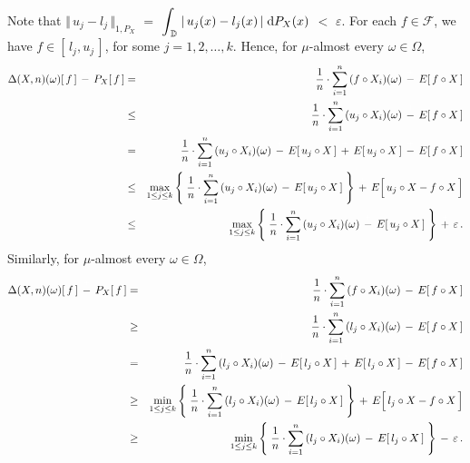 Note that
$\Vert\,u_{j} - l_{j}\,\Vert_{1,P_{X}}$
$=$ $\mathlarger{\int}_{\,\D}\;\vert\,u_{j}(x) - l_{j}(x)\,\vert\;\d P_{X}(x)$
$<$ $\varepsilon$.
\vskip 0.5cm
\noindent
For each $f \in \mathcal{F}$, we have $f \in [\,l_{j},u_{j}\,]$, for some $j = 1,2,\ldots,k$.
Hence, for $\mu$-almost every $\omega\in\Omega$,
\begin{eqnarray*}
\Delta(X,n)(\omega)[\,f\,]\,\overset{{\color{white}+}}{-}\,P_{X}[\,f\,]
& = &
	\dfrac{1}{n}\cdot \overset{n}{\underset{i=1}{\sum}}\,(f \circ X_{i})(\omega)
	\,\overset{{\color{white}+}}{-}\,
	E[\,f \circ X\,]
\\
& \leq &
	\dfrac{1}{n}\cdot \overset{n}{\underset{i=1}{\sum}}\,(u_{j} \circ X_{i})(\omega)
	\,\overset{{\color{white}+}}{-}\,
	E[\,f \circ X\,]
\\
& = &
	\dfrac{1}{n}\cdot \overset{n}{\underset{i=1}{\sum}}\,(u_{j} \circ X_{i})(\omega)
	\,\overset{{\color{white}+}}{-}\,
	E[\,u_{j} \circ X\,]
	\,\overset{{\color{white}+}}{+}\,
	E[\,u_{j} \circ X\,]
	\,\overset{{\color{white}+}}{-}\,
	E[\,f \circ X\,]
\\
& \leq &
	\underset{1\leq j \leq k}{\max}\left\{\;
		\dfrac{1}{n}\cdot \overset{n}{\underset{i=1}{\sum}}\,(u_{j} \circ X_{i})(\omega)
		\,\overset{{\color{white}+}}{-}\,
		E[\,u_{j} \circ X\,]
		\;\right\}
	\,\overset{{\color{white}+}}{+}\,
	E\!\left[\, u_{j} \circ X \overset{{\color{white}.}}{-} f \circ X\,\right]
\\
& \leq &
	\underset{1\leq j \leq k}{\max}\left\{\;
		\dfrac{1}{n}\cdot \overset{n}{\underset{i=1}{\sum}}\,(u_{j} \circ X_{i})(\omega)
		\,\overset{{\color{white}+}}{-}\,
		E[\,u_{j} \circ X\,]
		\;\right\}
	\,\overset{{\color{white}+}}{+}\,
	\varepsilon\,.
\end{eqnarray*}
Similarly, for $\mu$-almost every $\omega\in\Omega$,
\begin{eqnarray*}
\Delta(X,n)(\omega)[\,f\,]\,\overset{{\color{white}+}}{-}\,P_{X}[\,f\,]
& = &
	\dfrac{1}{n}\cdot \overset{n}{\underset{i=1}{\sum}}\,(f \circ X_{i})(\omega)
	\,\overset{{\color{white}+}}{-}\,
	E[\,f \circ X\,]
\\
& \geq &
	\dfrac{1}{n}\cdot \overset{n}{\underset{i=1}{\sum}}\,(l_{j} \circ X_{i})(\omega)
	\,\overset{{\color{white}+}}{-}\,
	E[\,f \circ X\,]
\\
& = &
	\dfrac{1}{n}\cdot \overset{n}{\underset{i=1}{\sum}}\,(l_{j} \circ X_{i})(\omega)
	\,\overset{{\color{white}+}}{-}\,
	E[\,l_{j} \circ X\,]
	\,\overset{{\color{white}+}}{+}\,
	E[\,l_{j} \circ X\,]
	\,\overset{{\color{white}+}}{-}\,
	E[\,f \circ X\,]
\\
& \geq &
	\underset{1\leq j \leq k}{\min}\left\{\;
		\dfrac{1}{n}\cdot \overset{n}{\underset{i=1}{\sum}}\,(l_{j} \circ X_{i})(\omega)
		\,\overset{{\color{white}+}}{-}\,
		E[\,l_{j} \circ X\,]
		\;\right\}
	\,\overset{{\color{white}+}}{+}\,
	E\!\left[\, l_{j} \circ X \overset{{\color{white}.}}{-} f \circ X\,\right]
\\
& \geq &
	\underset{1\leq j \leq k}{\min}\left\{\;
		\dfrac{1}{n}\cdot \overset{n}{\underset{i=1}{\sum}}\,(l_{j} \circ X_{i})(\omega)
		\,\overset{{\color{white}+}}{-}\,
		E[\,l_{j} \circ X\,]
		\;\right\}
	\,\overset{{\color{white}+}}{-}\,
	\varepsilon\,.
\end{eqnarray*}
